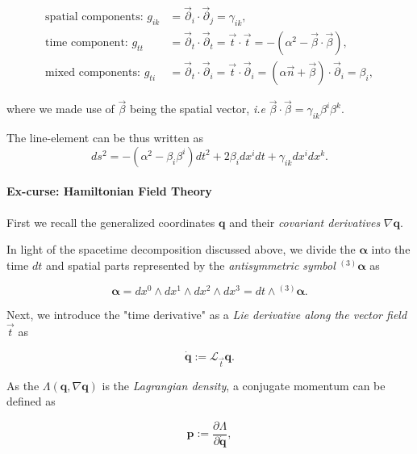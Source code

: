 \begin{align}
\text{spatial components: } g_{ik}&=\vec{\partial}_{i}\cdot\vec{\partial}_{j} =\gamma_{ik}, \\
\text{time component: } g_{tt} &= \vec{\partial}_{t}\cdot\vec{\partial}_{t} = \vec{t}\cdot\vec{t} = - (\alpha^2-\vec{\beta}\cdot\vec{\beta}), \\
\text{mixed components: } g_{ti} &= \vec{\partial}_{t}\cdot\vec{\partial}_{i} = \vec{t}\cdot\vec{\partial}_i = (\alpha\vec{n}+\vec{\beta})\cdot\vec{\partial}_i=\beta_i,
\end{align}

where we made use of $\vec{\beta}$ being the spatial vector, \textit{i.e} $\vec{\beta}\cdot\vec{\beta}=\gamma_{ik}\beta^i\beta^k$.

The line-element can be thus written as
\begin{equation}
ds^2 = -(\alpha^2-\beta_i\beta^i)dt^2 +2\beta_i dx^i dt + \gamma_{ik} dx^i dx^k.
\end{equation}


\paragraph{Ex-curse: Hamiltonian Field Theory}


First we recall the generalized coordinates $\boldsymbol{q}$ and their \textit{covariant derivatives} $\nabla\boldsymbol{q}$. 

In light of the spacetime decomposition discussed above, we divide the $\boldsymbol{\alpha}$ into the time $dt$ and spatial parts represented by the \textit{antisymmetric symbol} ${^{(3)}\boldsymbol{\alpha}}$ as 

\begin{equation}
\boldsymbol{\alpha} = dx^0 \wedge dx^1 \wedge dx^2 \wedge dx^3 = dt \wedge {^{(3)}\boldsymbol{\alpha}}.
\end{equation}

Next, we introduce the "time derivative" as a \textit{Lie derivative along the vector field} $\vec{t}$ as 

\begin{equation}
\dot{\boldsymbol{q}} := \mathcal{L}_{\vec{t}}\boldsymbol{q}.
\end{equation}

As the $\Lambda(\boldsymbol{q}, \nabla\boldsymbol{q})$ is the \textit{Lagrangian density}, a conjugate momentum can be defined as 

\begin{equation}
\boldsymbol{p} := \frac{\partial\Lambda}{\partial\dot{\boldsymbol{q}}},
\end{equation}

